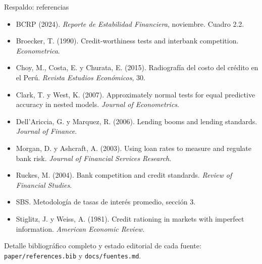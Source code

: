 \documentclass[aspectratio=169,10pt,t]{beamer}
\newcommand{\source}[1]{\par\vfill{\fontsize{6}{7.2}\selectfont\color{soft}#1\par}}
\begin{document}
\begin{frame}{Respaldo: referencias}
\vspace{2mm}
\footnotesize
\begin{itemize}\setlength{\itemsep}{1.1mm}
\item BCRP (2024). \emph{Reporte de Estabilidad Financiera}, noviembre. Cuadro 2.2.
\item Broecker, T. (1990). Credit-worthiness tests and interbank competition.
\emph{Econometrica}.
\item Choy, M., Costa, E. y Churata, E. (2015). Radiografía del costo del crédito en el
Perú. \emph{Revista Estudios Económicos}, 30.
\item Clark, T. y West, K. (2007). Approximately normal tests for equal predictive
accuracy in nested models. \emph{Journal of Econometrics}.
\item Dell'Ariccia, G. y Marquez, R. (2006). Lending booms and lending standards.
\emph{Journal of Finance}.
\item Morgan, D. y Ashcraft, A. (2003). Using loan rates to measure and regulate bank
risk. \emph{Journal of Financial Services Research}.
\item Ruckes, M. (2004). Bank competition and credit standards. \emph{Review of
Financial Studies}.
\item SBS. Metodología de tasas de interés promedio, sección 3.
\item Stiglitz, J. y Weiss, A. (1981). Credit rationing in markets with imperfect
information. \emph{American Economic Review}.
\end{itemize}
\source{Detalle bibliográfico completo y estado editorial de cada fuente:
\texttt{paper/references.bib} y \texttt{docs/fuentes.md}.}
\end{frame}
\end{document}
